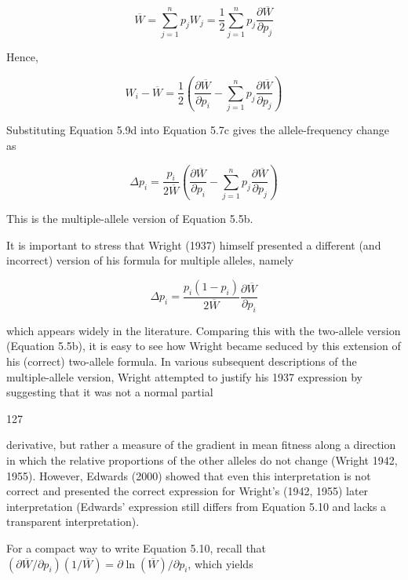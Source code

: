 \documentclass{article}
\begin{document}
\begin{equation}
\overline{W}=\sum_{j=1}^{n}p_{j}W_{j}=\frac{1}{2}\sum_{j=1}^{n}p_{j}\frac{\partial\overline{W}}{\partial p_{j}}
\tag{5.9c}
\label{eq:5_9c}
\end{equation}

Hence,

\begin{equation}
W_{i}-\overline{W}=\frac{1}{2}\left(\frac{\partial\overline{W}}{\partial p_{i}}-\sum_{j=1}^{n}p_{j}\frac{\partial\overline{W}}{\partial p_{j}}\right)
\tag{5.9d}
\label{eq:5_9d}
\end{equation}

Substituting Equation 5.9d into Equation 5.7c gives the allele-frequency change as

\begin{equation}
\Delta p_{i}=\frac{p_{i}}{2\overline{W}}\left(\frac{\partial\overline{W}}{\partial p_{i}}-\sum_{j=1}^{n}p_{j}\frac{\partial\overline{W}}{\partial p_{j}}\right)
\tag{5.10}
\label{eq:5_10}
\end{equation}

This is the multiple-allele version of Equation 5.5b.

It is important to stress that Wright (1937) himself presented a different (and incorrect) version of his formula for multiple alleles, namely

\begin{equation}
\Delta p_{i}=\frac{p_{i}(1-p_{i})}{2\overline{W}}\frac{\partial\overline{W}}{\partial p_{i}}
\end{equation}

which appears widely in the literature. Comparing this with the two-allele version (Equation 5.5b), it is easy to see how Wright became seduced by this extension of his (correct) two-allele formula. In various subsequent descriptions of the multiple-allele version, Wright attempted to justify his 1937 expression by suggesting that it was not a normal partial

127

derivative, but rather a measure of the gradient in mean fitness along a direction in which the relative proportions of the other alleles do not change (Wright 1942, 1955). However, Edwards (2000) showed that even this interpretation is not correct and presented the correct expression for Wright's (1942, 1955) later interpretation (Edwards' expression still differs from Equation 5.10 and lacks a transparent interpretation).

For a compact way to write Equation 5.10, recall that $(\partial \overline{W}/\partial p_i)(1/\overline{W})=\partial \ln(\overline{W})/\partial p_i$, which yields
\end{document}
